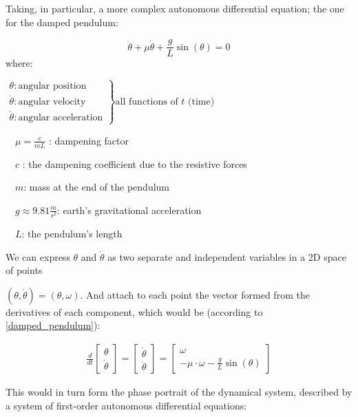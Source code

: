Taking, in particular, a more complex autonomous differential equation; the one for the damped pendulum:

\begin{equation}\label{damped_pendulum}
  \ddot{\theta} +\mu\dot{\theta} + \frac{g}{L}\sin(\theta) = 0
\end{equation}
where:  \par
$
\left.
\begin{array}{l}
  \theta : \text{angular position}       \\
  \dot{\theta} : \text{angular velocity} \\
  \ddot{\theta} : \text{angular acceleration}
\end{array}
\right\}
\text{all functions of } t \text{ (time)}
$

\ \ $\mu = \frac{c}{mL}$ : dampening factor \par
\ \ $c$ : the dampening coefficient due to the resistive forces \par
\ \ $m$: mass at the end of the pendulum \par
\ \ $g \approx 9.81 \frac{m}{s^2}$: earth's gravitational acceleration \par
\ \ $L$: the pendulum's length \par

We can express $\theta$ and $\dot{\theta}$ as two separate and independent variables in a 2D space of points \par $(\theta,\dot{\theta}) = (\theta,\omega)$.
And attach to each point the vector formed from the derivatives of each component, which would be (according to \ref{damped_pendulum}):

\begin{align}
\frac{d}{dt}
\begin{bmatrix}
  \theta \\
  \dot{\theta}
\end{bmatrix} =
\begin{bmatrix}
  \dot{\theta} \\
  \ddot{\theta}
\end{bmatrix} =
\begin{bmatrix}
  \omega \\
  -\mu \cdot \omega - \frac{g}{L}\sin(\theta)
\end{bmatrix}
\end{align}

This would in turn form the phase portrait of the dynamical system, described by a system of first-order autonomous differential equations:

